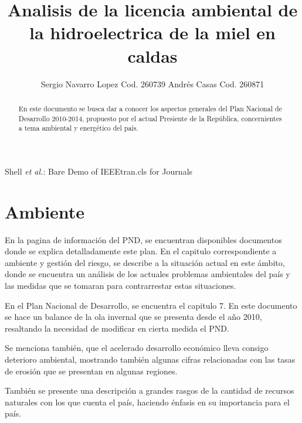 \documentclass[journal]{./oldtran/IEEEtran}
\begin{document}
\title{Analisis de la licencia ambiental de la hidroelectrica de la miel en caldas}
\author{Sergio Navarro Lopez Cod. 260739  Andrés Casas Cod. 260871 }
%
{Shell \MakeLowercase{\textit{et al.}}: Bare Demo of IEEEtran.cls for Journals}

\maketitle


\begin{abstract}
En este documento se busca dar a conocer los aspectos generales del Plan Nacional de Desarrollo 2010-2014, propuesto por el actual Presiente de la República, concernientes a tema ambiental y energético del país.
\end{abstract}

\begin{IEEEkeywords}
\end{IEEEkeywords}

\IEEEpeerreviewmaketitle
%
%




\section{Ambiente}

En la pagina de información del PND, se encuentran disponibles documentos donde se explica detalladamente este plan. En el capitulo correspondiente a ambiente y gestión del riesgo, se describe a la situación actual en este ámbito, donde se encuentra un análisis de los actuales problemas ambientales del país y las medidas que se tomaran para contrarrestar estas situaciones.

En el Plan Nacional de Desarrollo, se encuentra el capitulo 7. En este documento se hace un balance de la ola invernal que se presenta desde el año 2010, resaltando la necesidad de modificar en cierta medida el PND. 

Se menciona también, que el acelerado desarrollo económico lleva consigo deterioro ambiental, mostrando también algunas cifras relacionadas con las tasas de erosión que se presentan en algunas regiones.

También se presente una descripción a grandes rasgos de la cantidad de recursos naturales con los que cuenta el país, haciendo énfasis en su importancia para el país.
\end{document}
